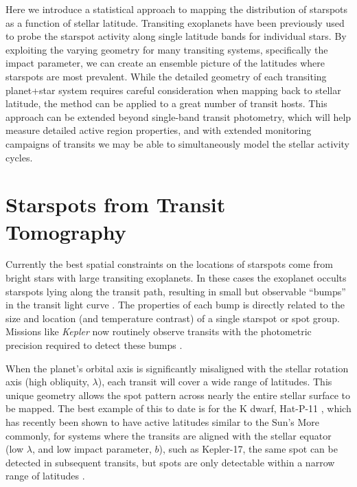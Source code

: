 \documentclass[preprint2]{aastex61}
\newcommand{\Kepler}{\textsl{Kepler}\xspace}
\begin{document}
Here we introduce a statistical approach to mapping the distribution of starspots as a function of stellar latitude. Transiting exoplanets have been previously used to probe the starspot activity along single latitude bands for individual stars. By exploiting the varying geometry for many transiting systems, specifically the impact parameter, we can create an ensemble picture of the latitudes where starspots are most prevalent. While the detailed geometry of each transiting planet+star system requires careful consideration when mapping back to stellar latitude, the method can be applied to a great number of transit hosts. This approach can be extended beyond single-band transit photometry, which will help measure detailed active region properties, and with extended monitoring campaigns of transits we may be able to simultaneously model the stellar activity cycles.





\section{Starspots from Transit Tomography}
\label{sec:transit}


Currently the best spatial constraints on the locations of starspots come from bright stars with large transiting exoplanets. In these cases the exoplanet occults starspots lying along the transit path, resulting in small but observable ``bumps'' in the transit light curve \citep{silva2003}. The properties of each bump is directly related to the size and location (and temperature contrast) of a single starspot or spot group. Missions like \Kepler now routinely observe transits with the photometric precision required to detect these bumps \citep{borucki2010}.

When the planet's orbital axis is significantly misaligned with the stellar rotation axis (high obliquity, $\lambda$), each transit will cover a wide range of latitudes. This unique geometry allows the spot pattern across nearly the entire stellar surface to be mapped. The best example of this to date is for the K dwarf, Hat-P-11 \citep{sanchis-ojeda2011}, which has recently been shown to have active latitudes similar to the Sun's \citep{morris2017}
More commonly, for systems where the transits are aligned with the stellar equator (low $\lambda$, and low impact parameter, $b$), such as Kepler-17, the same spot can be detected in subsequent transits, but spots are only detectable within a narrow range of latitudes \citep{davenport_phd}. 
\end{document}
